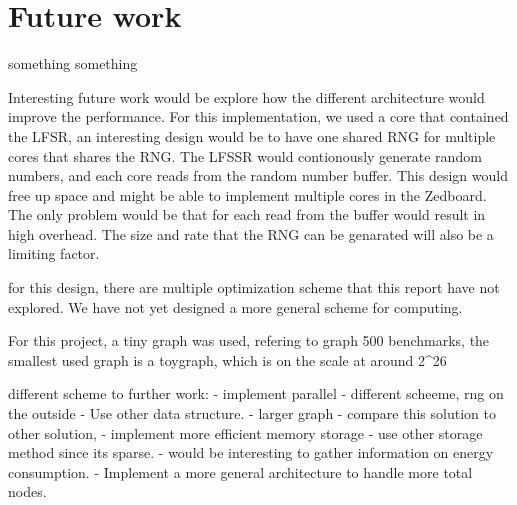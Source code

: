 \chapter{Future work} \label{futureWork}
something something

Interesting future work would be explore how the different architecture would improve the performance. For this implementation, we used a core that contained the LFSR, an interesting design would be to have one shared RNG for multiple cores that shares the RNG. The LFSSR would contionously generate random numbers, and each core reads from the random number buffer. This design would free up space and might be able to implement multiple cores in the Zedboard. The only problem would be that for each read from the buffer would result in high overhead. The size and rate that the RNG can be genarated will also be a limiting factor.

for this design, there are multiple optimization scheme that this report have not explored. We have not yet designed a more general scheme for computing. 

For this project, a tiny graph was used, refering to graph 500 benchmarks, the smallest used graph is a toygraph, which is on the scale at around 2^26


different scheme to further work:
- implement parallel
- different scheeme, rng on the outside
- Use other data structure.
- larger graph
- compare this solution to other solution, 
- implement more efficient memory storage
- use other storage method since its sparse. 
- would be interesting to gather information on  energy consumption.
- Implement a more general architecture to handle more total nodes.

